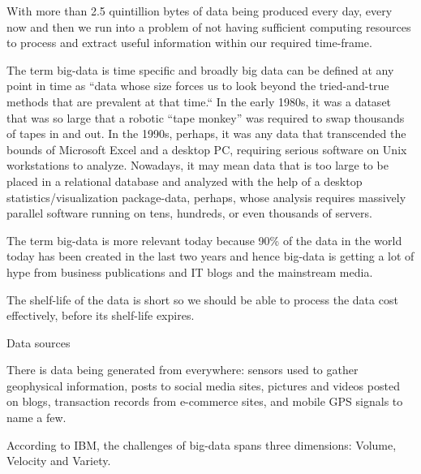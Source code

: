 \documentclass[12pt,a4paper]{report}
\begin{document}
With more than 2.5 quintillion bytes of data\cite{website:ibm-bigdata} being produced
every day, every now and then we run into a problem of not having 
sufficient computing resources to process and extract useful information
within our required time-frame.

The term big-data is time specific and broadly
big data can be defined at any point in time as ``data whose size forces us
 to look beyond the tried-and-true methods
that are prevalent at that time.`` In the early 1980s, it was a dataset that was
 so large that a robotic ``tape monkey'' was required to swap thousands of tapes in and out.
In the 1990s, perhaps, it was any data that transcended the bounds of Microsoft
Excel and a desktop PC, requiring serious software on Unix workstations to
analyze. Nowadays, it may mean data 
that is too large to be placed in a relational database and analyzed with the
help of a desktop statistics/visualization package-data, perhaps, whose
analysis requires massively parallel software running on tens, hundreds, or
even thousands of servers\cite{jacobs2009pathologies}.

The term big-data is more relevant today because 90\%\cite{website:ibm-bigdata}
of the data in the world today has been created in the last two years and 
hence big-data is getting a lot of hype from business publications and IT blogs
and the mainstream media. 

The shelf-life of the data is short so we should be able to process the data cost effectively,
before its shelf-life expires.


Data sources

There is data being generated from everywhere: sensors used to gather geophysical information, 
posts to social media sites, pictures and videos posted on blogs, transaction
records from e-commerce sites, and mobile GPS signals to name a few.

According to IBM, the challenges of big-data spans three dimensions: Volume,
Velocity and Variety\cite{website:ibm-bigdata}.
\end{document}
